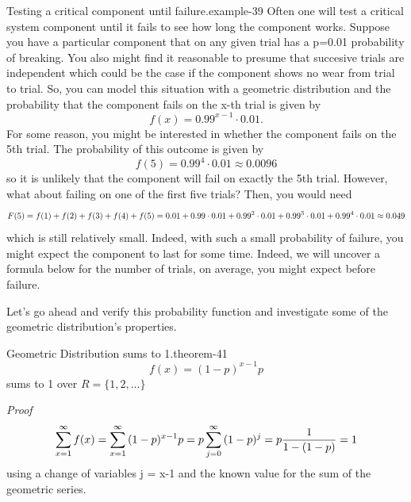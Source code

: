 \documentclass[10pt,]{book}
\makeatletter
\renewcommand*{\proofname}{Proof}
\renewenvironment{proof}[1][\proofname]{\par
  \pushQED{\qed}%
  \normalfont \topsep6\p@\@plus6\p@\relax
  \trivlist
  \item\relax
    {\itshape
    #1\@addpunct{.}}\hspace\labelsep\ignorespaces
}{%
  \popQED\endtrivlist\@endpefalse
}
\numberwithin{equation}{section}
\makeatother
\begin{document}
\begin{example}{Testing a critical component until failure.}{example-39}%
\hypertarget{p-945}{}%
Often one will test a critical system component until it fails to see how long the component works. Suppose you have a particular component that on any given trial has a p=0.01 probability of breaking. You also might find it reasonable to presume that succesive trials are independent which could be the case if the component shows no wear from trial to trial. So, you can model this situation with a geometric distribution and the probability that the component fails on the x-th trial is given by%
\begin{equation*}
f(x) = 0.99^{x-1} \cdot 0.01.
\end{equation*}
For some reason, you might be interested in whether the component fails on the 5th trial. The probability of this outcome is given by%
\begin{equation*}
f(5) = 0.99^4 \cdot 0.01 \approx 0.0096
\end{equation*}
so it is unlikely that the component will fail on exactly the 5th trial. However, what about failing on one of the first five trials? Then, you would need%
\begin{equation*}
F(5) = f(1)+f(2)+f(3)+f(4)+f(5) \\ = 0.01 + 0.99 \cdot 0.01 + 0.99^2 \cdot 0.01 + 0.99^3 \cdot 0.01 + 0.99^4 \cdot 0.01 \approx 0.049
\end{equation*}
which is still relatively small. Indeed, with such a small probability of failure, you might expect the component to last for some time. Indeed, we will uncover a formula below for the number of trials, on average, you might expect before failure.%
\end{example}
\hypertarget{p-946}{}%
Let's go ahead and verify this probability function and investigate some of the geometric distribution's properties.%
\par
\hypertarget{p-947}{}%
\begin{theorem}{Geometric Distribution sums to 1.}{}{theorem-41}%
\hypertarget{p-948}{}%
%
\begin{equation*}
f(x) = (1-p)^{x-1}p
\end{equation*}
sums to 1 over \(R = \{ 1, 2, ... \}\)%
\end{theorem}
\begin{proof}\hypertarget{proof-44}{}
\hypertarget{p-949}{}%
%
\begin{equation*}
\sum_{x=1}^{\infty} {f(x)} = \sum_{x=1}^{\infty} {(1-p)^{x-1} p} \\ = p \sum_{j=0}^{\infty} {(1-p)^j} = p \frac{1}{1-(1-p)} = 1
\end{equation*}
using a change of variables j = x-1 and the known value for the sum of the geometric series.%
\end{proof}
\end{document}

